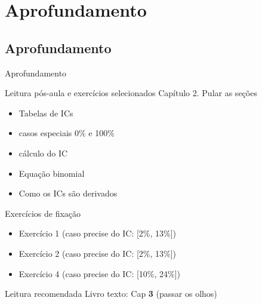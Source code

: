 \documentclass{beamer}
\begin{document}
\section{Aprofundamento}

\subsection{Aprofundamento}

\begin{frame}{\scriptsize Aprofundamento}
  \begin{block}{Leitura pós-aula e exercícios selecionados}
    \footnotesize
    Capítulo 2. Pular as seções
    \begin{itemize}
      \scriptsize
    \item Tabelas de ICs
    \item casos especiais 0\% e 100\%
    \item cálculo do IC
    \item Equação binomial
    \item Como os ICs são derivados
    \end{itemize}
  \end{block}

  \begin{block}{Exercícios de fixação}
    \begin{itemize}
      \scriptsize
    \item Exercício 1 (caso precise do IC: [2\%, 13\%])
    \item Exercício 2 (caso precise do IC: [2\%, 13\%])
    \item Exercício 4 (caso precise do IC: [10\%, 24\%])
    \end{itemize}
  \end{block}

  \begin{block}{Leitura recomendada}
    \scriptsize
    Livro texto: Cap {\bf 3} (passar os olhos)
  \end{block}
\end{frame}
\end{document}
